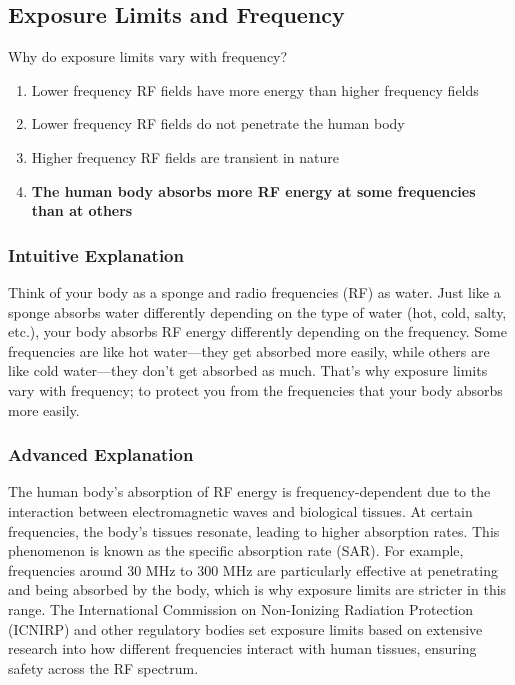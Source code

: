 \subsection{Exposure Limits and Frequency}
\label{T0C05}

\begin{tcolorbox}[colback=gray!10!white,colframe=black!75!black,title=T0C05]
Why do exposure limits vary with frequency?
\begin{enumerate}[noitemsep]
    \item Lower frequency RF fields have more energy than higher frequency fields
    \item Lower frequency RF fields do not penetrate the human body
    \item Higher frequency RF fields are transient in nature
    \item \textbf{The human body absorbs more RF energy at some frequencies than at others}
\end{enumerate}
\end{tcolorbox}

\subsubsection*{Intuitive Explanation}
Think of your body as a sponge and radio frequencies (RF) as water. Just like a sponge absorbs water differently depending on the type of water (hot, cold, salty, etc.), your body absorbs RF energy differently depending on the frequency. Some frequencies are like hot water—they get absorbed more easily, while others are like cold water—they don't get absorbed as much. That's why exposure limits vary with frequency; to protect you from the frequencies that your body absorbs more easily.

\subsubsection*{Advanced Explanation}
The human body's absorption of RF energy is frequency-dependent due to the interaction between electromagnetic waves and biological tissues. At certain frequencies, the body's tissues resonate, leading to higher absorption rates. This phenomenon is known as the specific absorption rate (SAR). For example, frequencies around 30 MHz to 300 MHz are particularly effective at penetrating and being absorbed by the body, which is why exposure limits are stricter in this range. The International Commission on Non-Ionizing Radiation Protection (ICNIRP) and other regulatory bodies set exposure limits based on extensive research into how different frequencies interact with human tissues, ensuring safety across the RF spectrum.

